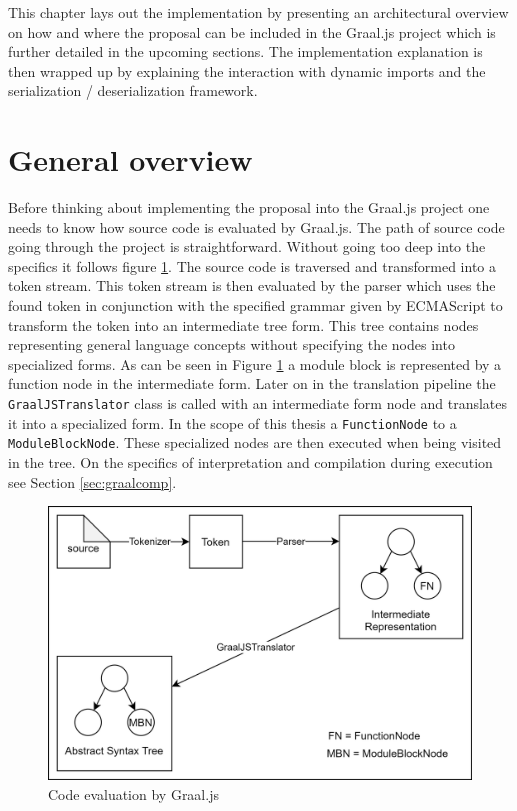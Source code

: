 This chapter lays out the implementation by presenting an architectural overview on how and where the proposal can be included in the Graal.js project which is further detailed in the upcoming sections. The implementation explanation is then wrapped up by explaining the interaction with dynamic imports and the serialization / deserialization framework.

\section{General overview}
Before thinking about implementing the proposal into the Graal.js project one needs to know how source code is evaluated by Graal.js. The path of source code going through the project is straightforward. Without going too deep into the specifics it follows figure \ref{fig:mainImpl}. The source code is traversed and transformed into a token stream. This token stream is then evaluated by the parser which uses the found token in conjunction with the specified grammar given by ECMAScript \cite{ecma} to transform the token into an intermediate tree form. This tree contains nodes representing general language concepts without specifying the nodes into specialized forms. As can be seen in Figure \ref{fig:mainImpl} a module block is represented by a function node in the intermediate form. Later on in the translation pipeline the \texttt{GraalJSTranslator} class is called with an intermediate form node and translates it into a specialized form. In the scope of this thesis a \texttt{FunctionNode} to a \texttt{ModuleBlockNode}. These specialized nodes are then executed when being visited in the tree. On the specifics of interpretation and compilation during execution see Section \ref{sec:graalcomp}. 

\begin{figure}[h!]
    \centering
    \includegraphics[scale=0.165]{figures/implMain.png}
    \caption{Code evaluation by Graal.js}
    \label{fig:mainImpl}
\end{figure}

